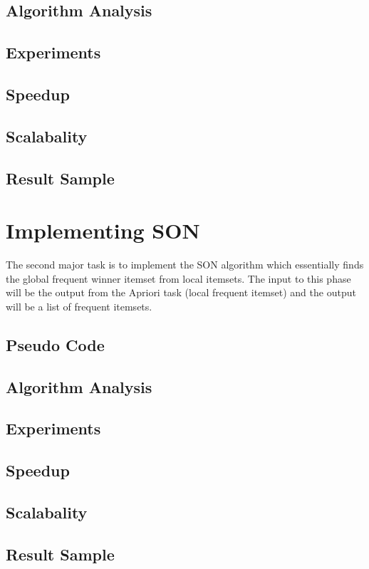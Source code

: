 \documentclass[11pt]{article}
\begin{document}
\subsection {Algorithm Analysis}
\subsection {Experiments}
\subsection {Speedup}
\subsection {Scalabality}
\subsection {Result Sample}
 
\section{Implementing SON}
The second major task is to implement the SON algorithm which essentially finds the global frequent winner itemset from local itemsets. The input to this phase will be the output from the Apriori task (local frequent itemset) and the output will be a list of frequent itemsets.\\
\subsection {Pseudo Code}
\subsection {Algorithm Analysis}
\subsection {Experiments}
\subsection {Speedup}
\subsection {Scalabality}
\subsection {Result Sample}
\end{document}
